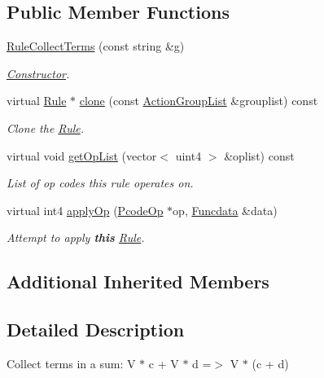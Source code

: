 \subsection*{Public Member Functions}
\begin{DoxyCompactItemize}
\item 
\mbox{\hyperlink{class_rule_collect_terms_a5fcf4c78908f57d388f3f69c8319030a}{Rule\+Collect\+Terms}} (const string \&g)
\begin{DoxyCompactList}\small\item\em \mbox{\hyperlink{class_constructor}{Constructor}}. \end{DoxyCompactList}\item 
virtual \mbox{\hyperlink{class_rule}{Rule}} $\ast$ \mbox{\hyperlink{class_rule_collect_terms_a6be2ea00cf9d1c164d33b1f662c74c44}{clone}} (const \mbox{\hyperlink{class_action_group_list}{Action\+Group\+List}} \&grouplist) const
\begin{DoxyCompactList}\small\item\em Clone the \mbox{\hyperlink{class_rule}{Rule}}. \end{DoxyCompactList}\item 
virtual void \mbox{\hyperlink{class_rule_collect_terms_a86d2d1fdf9cbaa1d7403a786a300e477}{get\+Op\+List}} (vector$<$ uint4 $>$ \&oplist) const
\begin{DoxyCompactList}\small\item\em List of op codes this rule operates on. \end{DoxyCompactList}\item 
virtual int4 \mbox{\hyperlink{class_rule_collect_terms_aae26ebf9404cb382f3b373dccbc64c69}{apply\+Op}} (\mbox{\hyperlink{class_pcode_op}{Pcode\+Op}} $\ast$op, \mbox{\hyperlink{class_funcdata}{Funcdata}} \&data)
\begin{DoxyCompactList}\small\item\em Attempt to apply {\bfseries{this}} \mbox{\hyperlink{class_rule}{Rule}}. \end{DoxyCompactList}\end{DoxyCompactItemize}
\subsection*{Additional Inherited Members}


\subsection{Detailed Description}
Collect terms in a sum\+: {\ttfamily V $\ast$ c + V $\ast$ d =$>$ V $\ast$ (c + d)} 

